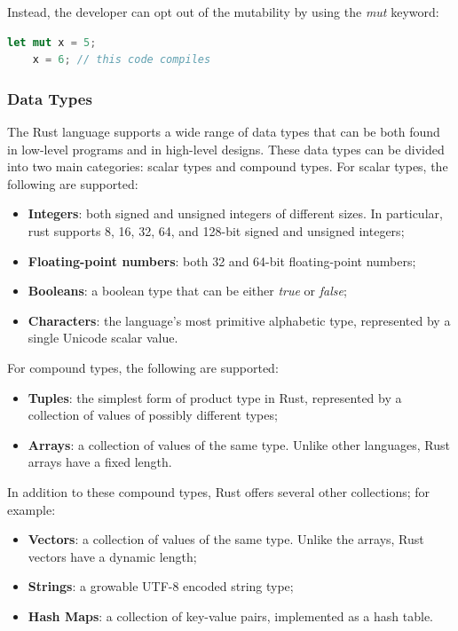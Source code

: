 Instead, the developer can opt out of the mutability by using the \textit{mut} keyword:

\begin{lstlisting}[language=Rust]
    let mut x = 5;
    x = 6; // this code compiles
\end{lstlisting}

\subsubsection{Data Types}
The Rust language supports a wide range of data types that can be both found in low-level programs and in high-level designs. These data types can be divided into two main categories: scalar types and compound types.
For scalar types, the following are supported:
\begin{itemize}
    \item \textbf{Integers}: both signed and unsigned integers of different sizes. In particular, rust supports 8, 16, 32, 64, and 128-bit signed and unsigned integers;
    \item \textbf{Floating-point numbers}: both 32 and 64-bit floating-point numbers;
    \item \textbf{Booleans}: a boolean type that can be either \textit{true} or \textit{false};
    \item \textbf{Characters}: the language's most primitive alphabetic type, represented by a single Unicode scalar value.
\end{itemize}

For compound types, the following are supported:
\begin{itemize}
    \item \textbf{Tuples}: the simplest form of product type in Rust, represented by a collection of values of possibly different types;
    \item \textbf{Arrays}: a collection of values of the same type. Unlike other languages, Rust arrays have a fixed length.
\end{itemize}

In addition to these compound types, Rust offers several other collections; for example:

\begin{itemize}
    \item \textbf{Vectors}: a collection of values of the same type. Unlike the arrays, Rust vectors have a dynamic length;
    \item \textbf{Strings}: a growable UTF-8 encoded string type;
    \item \textbf{Hash Maps}: a collection of key-value pairs, implemented as a hash table.
\end{itemize}


